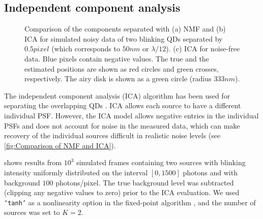 
\subsection{Independent component analysis\label{sub:ICA}}
\begin{figure}[!htb] %
	\caption{Comparison of the components separated with (a) NMF and (b) ICA for	simulated noisy data of two blinking QDs separated by $0.5 \unit{pixel}$ (which corresponds to $50\unit{nm}$ or $\lambda/12$). (c) ICA for noise-free data.  Blue pixels contain negative values. The true and the estimated positions are shown as red circles and green crosses, respectively. The airy disk is shown as a green circle (radius $333\unit{nm}$).}
	\label{fig:Comparison of NMF and ICA}
\end{figure}

The independent component analysis (ICA) algorithm \cite{Hyvarinen2000} has been used for separating the overlapping QDs \cite{Lidke2005}. ICA allows each source to have a different individual PSF.  However, the ICA model allows negative entries in the individual PSFs and does not account for noise in the measured data, which can make recovery of the individual sources difficult in realistic noise levels (see \autoref{fig:Comparison of NMF and ICA}). 

\bbb shows results from $10^{3}$ simulated frames containing two sources with blinking intensity uniformly distributed on the interval $[0, 1500]$ photons and with background $100$ photons/pixel. The true background level was subtracted (clipping any negative values to zero) prior to the ICA evaluation. We used {\tt `tanh'} as a nonlinearity option in the fixed-point algorithm \cite{Hyvarinen2000}, and the number of sources was set to $K=2$. 


